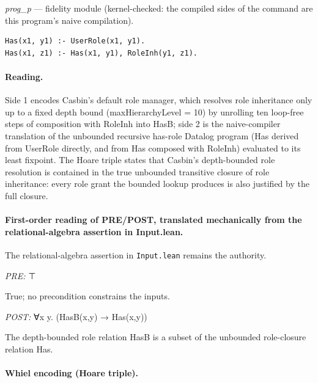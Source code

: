 \documentclass[10pt]{article}
\begin{document}
{\raggedright\textit{prog\_p} --- fidelity module (kernel-checked: the compiled sides of the command are this program's naive compilation).\par}

\begin{Verbatim}[fontsize=\scriptsize,breaklines=true,breakanywhere=true,frame=single,framesep=1.5mm]
Has(x1, y1) :- UserRole(x1, y1).
Has(x1, z1) :- Has(x1, y1), RoleInh(y1, z1).
\end{Verbatim}

\paragraph{Reading.} Side 1 encodes Casbin's default role manager, which resolves role inheritance only up to a fixed depth bound (maxHierarchyLevel = 10) by unrolling ten loop-free steps of composition with RoleInh into HasB; side 2 is the naive-compiler translation of the unbounded recursive has-role Datalog program (Has derived from UserRole directly, and from Has composed with RoleInh) evaluated to its least fixpoint. The Hoare triple states that Casbin's depth-bounded role resolution is contained in the true unbounded transitive closure of role inheritance: every role grant the bounded lookup produces is also justified by the full closure.

\paragraph{First-order reading of PRE/POST, translated mechanically from the relational-algebra assertion in Input.lean.} The relational-algebra assertion in \texttt{Input.lean} remains the authority.

\textit{PRE:} ⊤\par True; no precondition constrains the inputs.

\textit{POST:} ∀x y. (HasB(x,y) → Has(x,y))\par The depth-bounded role relation HasB is a subset of the unbounded role-closure relation Has.

\paragraph{Whiel encoding (Hoare triple).}
\end{document}
